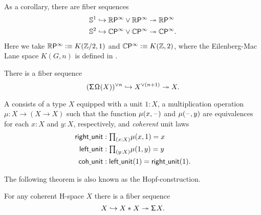 \begin{rmk}
As a corollary, there are fiber sequences
\begin{align*}
\mathbb{S}^{1} \hookrightarrow \mathbb{R}\mathsf{P}^{\infty}\vee \mathbb{R}\mathsf{P}^{\infty} & \twoheadrightarrow \mathbb{R}\mathsf{P}^{\infty} \\
\mathbb{S}^{2} \hookrightarrow \mathbb{C}\mathsf{P}^{\infty}\vee \mathbb{C}\mathsf{P}^{\infty} & \twoheadrightarrow \mathbb{C}\mathsf{P}^{\infty}.
\end{align*}
Here we take $\mathbb{R}\mathsf{P}^{\infty}\vcentcolon\equiv K(\mathbb{Z}/2,1)$ and $\mathbb{C}\mathsf{P}^{\infty}\vcentcolon\equiv K(\mathbb{Z},2)$, where the Eilenberg-Mac Lane space $K(G,n)$ is defined in \cite{FinsterLicata}.
\end{rmk}

\begin{cor}
There is a fiber sequence
\begin{equation*}
(\mathsf{\Sigma}^{}\mathsf{\Omega}^{}(X))^{\vee n} \hookrightarrow X^{\vee (n+1)} \twoheadrightarrow X.
\end{equation*}
\end{cor}

\begin{defn}\label{defn:coh_hspace}
A  consists of a type $X$ equipped with a unit $1:X$, a multiplication operation $\mu:X \to (X \to X)$ such that the function $\mu(x,\mathord{\hspace{1pt}\text{--}\hspace{1pt}})$ and $\mu(\mathord{\hspace{1pt}\text{--}\hspace{1pt}},y)$ are equivalences for each $x:X$ and $y:X$, respectively, and \emph{coherent} unit laws
\begin{align*}
\mathsf{right\usc{}unit} & : \prd{x: X} \mu(x,1)= x \\
\mathsf{left\usc{}unit} & : \prd{y:X} \mu(1,y) = y \\
\mathsf{coh\usc{}unit} & : \mathsf{left\usc{}unit}(1)=\mathsf{right\usc{}unit}(1).
\end{align*}
\end{defn}

The following theorem is also known as the Hopf-construction.

\begin{thm}\label{thm:hopf_construction}
For any coherent H-space $X$ there is a fiber sequence
\begin{equation*}
X \hookrightarrow {X}\ast_{}{X} \twoheadrightarrow \mathsf{\Sigma}^{} X.
\end{equation*}
\end{thm}


